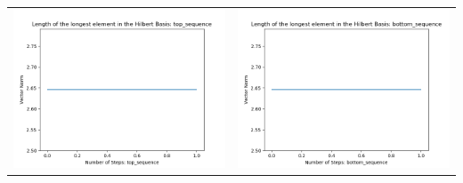 \documentclass[10pt]{article}
\begin{document}
\begin{tabular}{c|c}
\begin{minipage}{.45\textwidth}
\includegraphics[width=\textwidth]{"DATA/5d/6 generators 1 bound B/top_sequence LENGTH"}
\end{minipage} &
\begin{minipage}{.45\textwidth}
\includegraphics[width=\textwidth]{"DATA/5d/6 generators 1 bound B bottomup/bottom_sequence LENGTH"}
\end{minipage}
\end{tabular}
\end{document}
